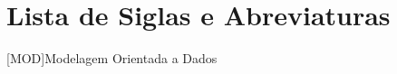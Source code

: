 \chapter*{Lista de Siglas e Abreviaturas}
\begin{acronym}

[MOD]{Modelagem Orientada a Dados}

\end{acronym}

